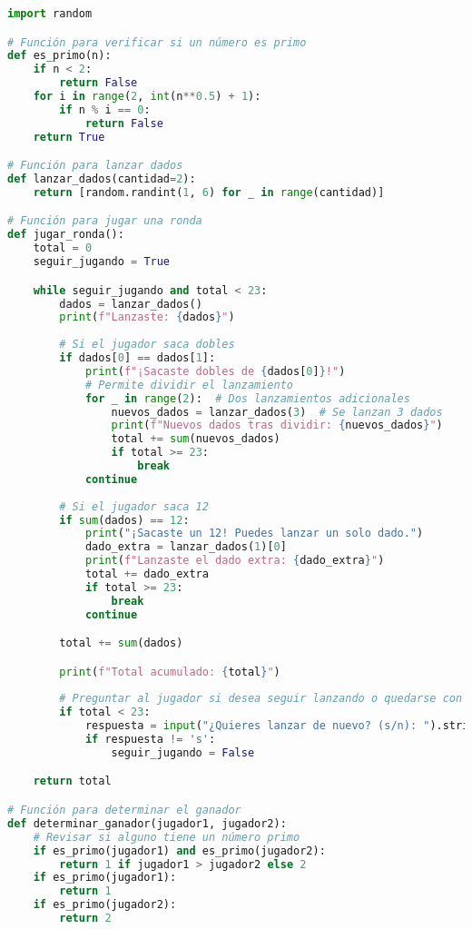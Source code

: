 \documentclass{article}
\begin{document}
\begin{lstlisting}[language=Python, caption=Código en Python]
import random

# Función para verificar si un número es primo
def es_primo(n):
    if n < 2:
        return False
    for i in range(2, int(n**0.5) + 1):
        if n % i == 0:
            return False
    return True

# Función para lanzar dados
def lanzar_dados(cantidad=2):
    return [random.randint(1, 6) for _ in range(cantidad)]

# Función para jugar una ronda
def jugar_ronda():
    total = 0
    seguir_jugando = True

    while seguir_jugando and total < 23:
        dados = lanzar_dados()
        print(f"Lanzaste: {dados}")
        
        # Si el jugador saca dobles
        if dados[0] == dados[1]:
            print(f"¡Sacaste dobles de {dados[0]}!")
            # Permite dividir el lanzamiento
            for _ in range(2):  # Dos lanzamientos adicionales
                nuevos_dados = lanzar_dados(3)  # Se lanzan 3 dados
                print(f"Nuevos dados tras dividir: {nuevos_dados}")
                total += sum(nuevos_dados)
                if total >= 23:
                    break
            continue
        
        # Si el jugador saca 12
        if sum(dados) == 12:
            print("¡Sacaste un 12! Puedes lanzar un solo dado.")
            dado_extra = lanzar_dados(1)[0]
            print(f"Lanzaste el dado extra: {dado_extra}")
            total += dado_extra
            if total >= 23:
                break
            continue

        total += sum(dados)

        print(f"Total acumulado: {total}")
        
        # Preguntar al jugador si desea seguir lanzando o quedarse con su total actual
        if total < 23:
            respuesta = input("¿Quieres lanzar de nuevo? (s/n): ").strip().lower()
            if respuesta != 's':
                seguir_jugando = False

    return total

# Función para determinar el ganador
def determinar_ganador(jugador1, jugador2):
    # Revisar si alguno tiene un número primo
    if es_primo(jugador1) and es_primo(jugador2):
        return 1 if jugador1 > jugador2 else 2
    if es_primo(jugador1):
        return 1
    if es_primo(jugador2):
        return 2
    

\end{lstlisting}
\end{document}
